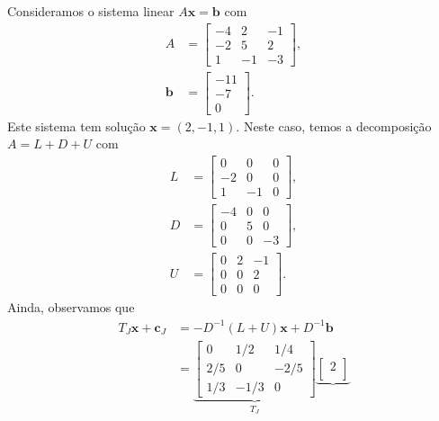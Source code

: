 \begin{ex}\label{cap_sislin_sec_jgs:ex:jacobi_intro}
  Consideramos o sistema linear $A\pmb{x} = \pmb{b}$ com
  \begin{equation}
    \begin{aligned}
    A &=
    \begin{bmatrix}
      -4 & 2 & -1 \\
      -2 & 5 & 2 \\
       1 & -1 & -3
    \end{bmatrix},\\
    \pmb{b} &=
    \begin{bmatrix}
      -11\\ -7\\ 0
    \end{bmatrix}.
  \end{aligned}
  \end{equation}
  Este sistema tem solução $\pmb{x} = (2, -1, 1)$. Neste caso, temos a decomposição $A = L + D + U$ com
  \begin{align}
    L &= \begin{bmatrix} 
      0 & 0 & 0 \\
      -2 & 0 & 0 \\
       1 & -1 & 0
     \end{bmatrix},\\
    D &= \begin{bmatrix}
      -4 & 0 & 0 \\
      0 & 5 & 0 \\
       0 & 0 & -3                  
     \end{bmatrix},\\
    U &= \begin{bmatrix}
      0 & 2 & -1 \\
      0 & 0 & 2 \\
      0 & 0 & 0
    \end{bmatrix}.
  \end{align}
  Ainda, observamos que
  \begin{align}
    T_J\pmb{x} + \pmb{c}_J &= -D^{-1}(L+U)\pmb{x} + D^{-1}\pmb{b}\\
    &= \underbrace{\begin{bmatrix}
        0 & 1/2 & 1/4 \\
        2/5 & 0 & -2/5 \\
        1/3 & -1/3 & 0
      \end{bmatrix}}_{T_J}
      \underbrace{\begin{bmatrix}
        2 \\

\end{bmatrix}}
\end{align}
\end{ex}
